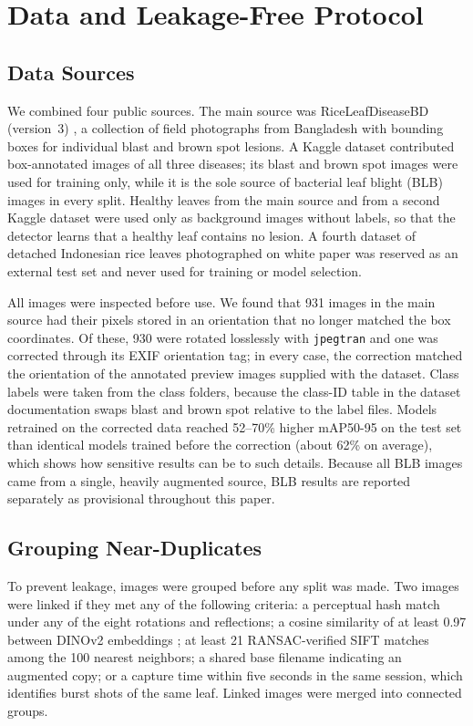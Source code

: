 \documentclass[conference,a4paper]{IEEEtran}
\begin{document}
\section{Data and Leakage-Free Protocol}

\subsection{Data Sources}
We combined four public sources. The main source was RiceLeafDiseaseBD (version~3) \cite{ds4}, a collection of field photographs from Bangladesh with bounding boxes for individual blast and brown spot lesions. A Kaggle dataset \cite{ds1} contributed box-annotated images of all three diseases; its blast and brown spot images were used for training only, while it is the sole source of bacterial leaf blight (BLB) images in every split. Healthy leaves from the main source and from a second Kaggle dataset \cite{ds2} were used only as background images without labels, so that the detector learns that a healthy leaf contains no lesion. A fourth dataset of detached Indonesian rice leaves photographed on white paper \cite{ds3} was reserved as an external test set and never used for training or model selection.

All images were inspected before use. We found that 931 images in the main source had their pixels stored in an orientation that no longer matched the box coordinates. Of these, 930 were rotated losslessly with \texttt{jpegtran} and one was corrected through its EXIF orientation tag; in every case, the correction matched the orientation of the annotated preview images supplied with the dataset. Class labels were taken from the class folders, because the class-ID table in the dataset documentation swaps blast and brown spot relative to the label files. Models retrained on the corrected data reached 52--70\% higher mAP50-95 on the test set than identical models trained before the correction (about 62\% on average), which shows how sensitive results can be to such details. Because all BLB images came from a single, heavily augmented source, BLB results are reported separately as provisional throughout this paper.

\subsection{Grouping Near-Duplicates}
To prevent leakage, images were grouped before any split was made. Two images were linked if they met any of the following criteria: a perceptual hash match under any of the eight rotations and reflections; a cosine similarity of at least 0.97 between DINOv2 embeddings \cite{oquab2024}; at least 21 RANSAC-verified SIFT matches \cite{lowe2004} among the 100 nearest neighbors; a shared base filename indicating an augmented copy; or a capture time within five seconds in the same session, which identifies burst shots of the same leaf. Linked images were merged into connected groups.
\end{document}
